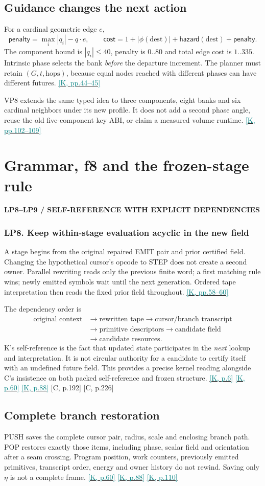 \documentclass[11pt,a4paper]{article}
\newcommand{\kref}[1]{\hyperlink{baseline.#1}{\textcolor{teal}{[K, p.#1]}}}
\newcommand{\krange}[2]{\hyperlink{baseline.#1}{\textcolor{teal}{[K, pp.#1--#2]}}}
\newcommand{\crefpage}[1]{\textcolor{muted}{[C, p.#1]}}
\newcommand{\status}[1]{{\sffamily\bfseries\scriptsize\color{teal}#1}\par}
\newcommand{\req}[2]{\subsubsection{#1. #2}}
\newcommand{\sectionstart}[1]{\par\addvspace{18pt}\Needspace{12\baselineskip}\section{#1}}
\theoremstyle{lpstyle}
\begin{document}
\subsection{Guidance changes the next action}
For a cardinal geometric edge $e$,
\[
\mathsf{penalty}=\max_i|q_i|-q\cdot e,\qquad
\mathsf{cost}=1+|\phi(\mathrm{dest})|+\mathsf{hazard}(\mathrm{dest})+\mathsf{penalty}.
\]
The component bound is $|q_i|\le40$, penalty is $0..80$ and total edge cost is $1..335$. Intrinsic phase selects the bank \emph{before} the departure increment. The planner must retain $(G,t,\mathrm{hops})$, because equal nodes reached with different phases can have different futures. \krange{44}{45}

VP8 extends the same typed idea to three components, eight banks and six cardinal neighbors under its new profile. It does not add a second phase angle, reuse the old five-component key ABI, or claim a measured volume runtime. \krange{102}{109}

\sectionstart{Grammar, f8 and the frozen-stage rule}
\status{LP8--LP9 / SELF-REFERENCE WITH EXPLICIT DEPENDENCIES}
\req{LP8}{Keep within-stage evaluation acyclic in the new field}
A stage begins from the original repaired EMIT pair and prior certified field. Changing the hypothetical cursor's opcode to STEP does not create a second owner. Parallel rewriting reads only the previous finite word; a first matching rule wins; newly emitted symbols wait until the next generation. Ordered tape interpretation then reads the fixed prior field throughout. \krange{58}{60}

The dependency order is
\begin{align*}
\text{original context}&\to\text{rewritten tape}\to\text{cursor/branch transcript}\\
&\to\text{primitive descriptors}\to\text{candidate field}\\
&\to\text{candidate resources}.
\end{align*}
K's self-reference is the fact that updated state participates in the \emph{next} lookup and interpretation. It is not circular authority for a candidate to certify itself with an undefined future field. This provides a precise kernel reading alongside C's insistence on both packed self-reference and frozen structure. \kref{6} \kref{60} \kref{88} \crefpage{192} \crefpage{226}

\subsection{Complete branch restoration}
PUSH saves the complete cursor pair, radius, scale and enclosing branch path. POP restores exactly those items, including phase, scalar field and orientation after a seam crossing. Program position, work counters, previously emitted primitives, transcript order, energy and owner history do not rewind. Saving only $\eta$ is not a complete frame. \kref{60} \kref{88} \kref{110}
\end{document}
